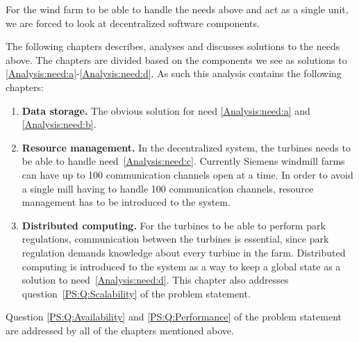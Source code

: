 For the wind farm to be able to handle the needs above and act as a single unit, we are forced to look at decentralized software components. 

The following chapters describes, analyses and discusses solutions to the needs above. The chapters are divided based on the components we see as solutions to \ref{Analysis:need:a}-\ref{Analysis:need:d}. As such this analysis contains the following chapters:

\begin{enumerate}[label=3.\arabic*]
\item{\textbf{Data storage.}} The obvious solution for need \ref{Analysis:need:a} and \ref{Analysis:need:b}.
\item{\textbf{Resource management.}} In the decentralized system, the turbines needs to be able to handle need~\ref{Analysis:need:c}. Currently Siemens windmill farms can have up to 100 communication channels open at a time. In order to avoid a single mill having to handle 100 communication channels, resource management has to be introduced to the system.
\item{\textbf{Distributed computing.}} For the turbines to be able to perform park regulations, communication between the turbines is essential, since park regulation demands knowledge about every turbine in the farm. Distributed computing is introduced to the system as a way to keep a global state as a solution to need~\ref{Analysis:need:d}. This chapter also addresses question~\ref{PS:Q:Scalability} of the problem statement.
\end{enumerate}

Question \ref{PS:Q:Availability} and \ref{PS:Q:Performance} of the problem statement are addressed by all of the chapters mentioned above.

%
%
%
%
%
%




